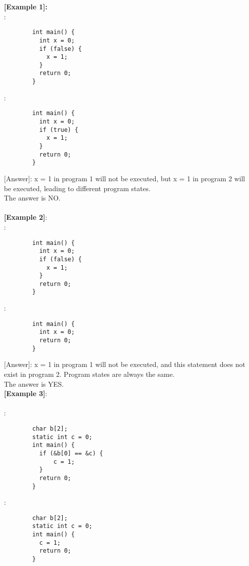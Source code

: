 \noindent\textbf{[Example 1]:}\\
      \text{    [Program 1]}:\\
      \begin{lstlisting}
        int main() {
          int x = 0;
          if (false) {
            x = 1;
          }
          return 0;
        }
      \end{lstlisting}
      \text{    [Program 2]}:\\
      \begin{lstlisting}
        int main() {
          int x = 0;
          if (true) {
            x = 1;
          }
          return 0;
        }
      \end{lstlisting}
      [Answer]: x = 1 in program 1 will not be executed, but x = 1 in program 2 will be executed, leading to different program states.\\
                The answer is NO.\\
\\
    \noindent\textbf{[Example 2]}:\\
      \text{    [Program 1]}:\\
      \begin{lstlisting}
        int main() {
          int x = 0;
          if (false) {
            x = 1;
          }
          return 0;
        }
      \end{lstlisting}
      \text{    [Program 2]}:\\
      \begin{lstlisting}
        int main() {
          int x = 0;
          return 0;
        }
      \end{lstlisting}
      [Answer]: x = 1 in program 1 will not be executed, and this statement does not exist in program 2. Program states are always the same.\\
                The answer is YES.\\
    \noindent\textbf{[Example 3]}:\\
\\
      \text{    [Program 1]}:\\
      \begin{lstlisting}
        char b[2];
        static int c = 0;
        int main() {
          if (&b[0] == &c) {
              c = 1;
          }
          return 0;
        }
      \end{lstlisting}
      \text{    [Program 2]}:\\
      \begin{lstlisting}
        char b[2];
        static int c = 0;
        int main() {
          c = 1;
          return 0;
        }
      \end{lstlisting}
